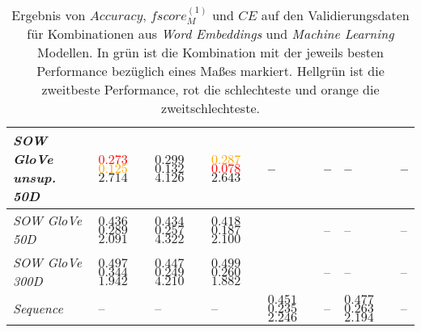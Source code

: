 \documentclass[a4paper,11pt]{article}
\begin{document}
\begin{table}[ht]
\begin{center}
\begin{tabular}{|m{2cm}||m{1.4cm}m{1.4cm}m{1.4cm}m{1.4cm}m{1.4cm}m{1.4cm}m{1.4cm}|}
 \hline
\textit{SOW GloVe unsup. 50D} & \textcolor{red}{$0.273$} \newline \textcolor{orange}{$0.125$} \newline $2.714$ & $0.299$ \newline $0.132$ \newline $4.126$ & \textcolor{orange}{$0.287$} \newline \textcolor{red}{$0.078$} \newline $2.643$ & -- & -- & -- & -- \\
 \hline
\textit{SOW GloVe 50D} & $0.436$ \newline $0.289$ \newline $2.091$ & $0.434$ \newline $0.257$ \newline $4.322$ & $0.418$ \newline $0.187$ \newline $2.100$ & & -- & -- & -- \\
 \hline
\textit{SOW GloVe 300D}  & $0.497$ \newline $0.344$ \newline $1.942$ & $0.447$ \newline $0.249$ \newline $4.210$ & $0.499$ \newline $0.260$ \newline $1.882$ & & -- & -- & -- \\
 \hline
\textit{Sequence} & -- & -- & -- & $0.451$ \newline $0.235$ \newline $2.246$ & -- & $0.477$ \newline $0.263$ \newline $2.194$ & -- \\
   \hline
\end{tabular}

  \caption{Ergebnis von $Accuracy$, $fscore_M^{(1)}$ und $CE$ auf den Validierungsdaten für Kombinationen aus \textit{Word Embeddings} und \textit{Machine Learning} Modellen. In grün ist die Kombination mit der jeweils besten Performance bezüglich eines Maßes markiert. Hellgrün ist die zweitbeste Performance, rot die schlechteste und orange die zweitschlechteste.}  
  \label{tab:preselection}
\end{center}
\end{table}
\end{document}
